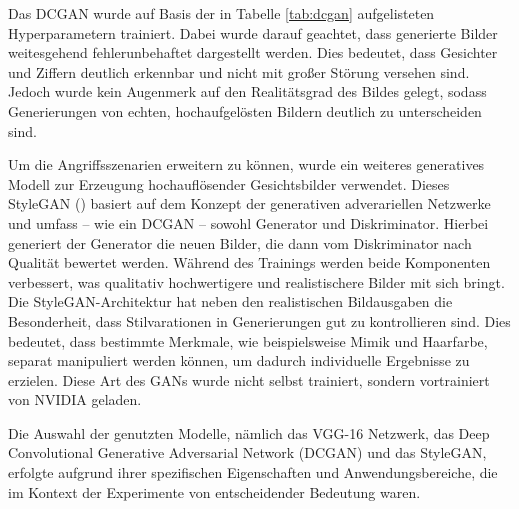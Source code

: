 \begin{table}[h]
	\centering
	\renewcommand{\arraystretch}{1.5}
	\caption{Hyperparameter eines DCGAN-Trainings bezüglich der angegebenen Datensätze}
	\label{tab:dcgan}
\end{table}

Das DCGAN wurde auf Basis der in Tabelle \ref{tab:dcgan} aufgelisteten Hyperparametern trainiert. Dabei wurde darauf geachtet, dass generierte Bilder \glqq weitesgehend fehlerunbehaftet\grqq{} dargestellt werden. Dies bedeutet, dass Gesichter und Ziffern deutlich erkennbar und nicht mit großer Störung versehen sind. Jedoch wurde kein Augenmerk auf den Realitätsgrad des Bildes gelegt, sodass Generierungen von echten, hochaufgelösten Bildern deutlich zu unterscheiden sind. 

Um die Angriffsszenarien erweitern zu können, wurde ein weiteres generatives Modell zur Erzeugung hochauflösender Gesichtsbilder verwendet. Dieses StyleGAN (\cite{karras_style-based_2019}) basiert auf dem Konzept der generativen adverariellen Netzwerke und umfass -- wie ein DCGAN -- sowohl Generator und Diskriminator. Hierbei generiert der Generator die neuen Bilder, die dann vom Diskriminator nach Qualität bewertet werden. Während des Trainings werden beide Komponenten verbessert, was qualitativ hochwertigere und realistischere Bilder mit sich bringt. Die StyleGAN-Architektur hat neben den realistischen Bildausgaben die Besonderheit, dass Stilvarationen in Generierungen gut zu kontrollieren sind. Dies bedeutet, dass bestimmte Merkmale, wie beispielsweise Mimik und Haarfarbe, separat manipuliert werden können, um dadurch individuelle Ergebnisse zu erzielen. Diese Art des GANs wurde nicht selbst trainiert, sondern vortrainiert von NVIDIA geladen.

Die Auswahl der genutzten Modelle, nämlich das VGG-16 Netzwerk, das Deep Convolutional Generative Adversarial Network (DCGAN) und das StyleGAN, erfolgte aufgrund ihrer spezifischen Eigenschaften und Anwendungsbereiche, die im Kontext der Experimente von entscheidender Bedeutung waren.

